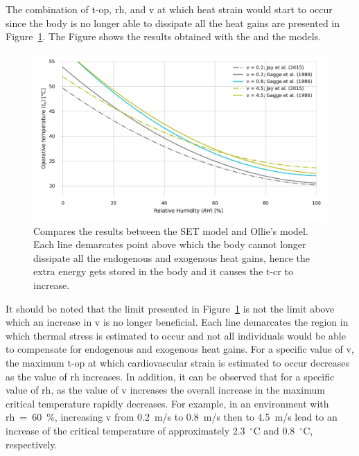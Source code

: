 The combination of \ac{t-op}, \ac{rh}, and \ac{v} at which heat strain would start to occur since the body is no longer able to dissipate all the heat gains are presented in Figure~\ref{fig:comparison_air_speed}.
The Figure shows the results obtained with the  and the  models.

\begin{figure}[thb!]
    \centering
    \includegraphics[width=\textwidth]{figures/comparison_air_speed.png}
    \caption{Compares the results between the SET model and Ollie's model.
    Each line demarcates point above which the body cannot longer dissipate all the endogenous and exogenous heat gains, hence the extra energy gets stored in the body and it causes the \acf{t-cr} to increase.}
    \label{fig:comparison_air_speed}
\end{figure}

It should be noted that the limit presented in Figure~\ref{fig:comparison_air_speed} is not the limit above which an increase in \ac{v} is no longer beneficial.
Each line demarcates the region in which thermal stress is estimated to occur and not all individuals would be able to compensate for endogenous and exogenous heat gains.
For a specific value of \ac{v}, the maximum \ac{t-op} at which cardiovascular strain is estimated to occur decreases as the value of \ac{rh} increases.
In addition, it can be observed that for a specific value of \ac{rh}, as the value of \ac{v} increases the overall increase in the maximum critical temperature rapidly decreases.
For example, in an environment with \ac{rh}~=~60~\%, increasing \ac{v} from 0.2~m/s to 0.8~m/s then to 4.5~m/s lead to an increase of the critical temperature of approximately 2.3~$^{\circ}$C and 0.8~$^{\circ}$C, respectively.

